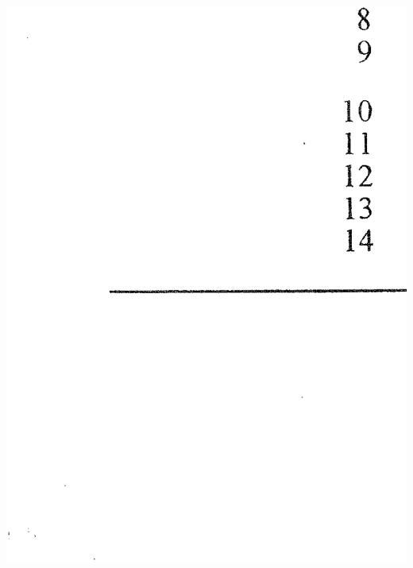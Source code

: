 \documentclass[12pt]{article}
\begin{document}
\begin{adjustwidth}{-1cm}{0cm}
\includegraphics[width=1.1\textwidth, trim = 2cm 4cm 2cm 3cm, clip]{Md1}
\end{adjustwidth}

\newpage
\end{document}
